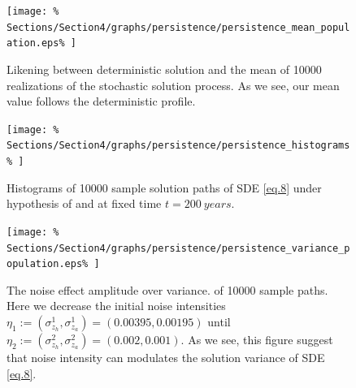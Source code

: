 \begin{figure}[p]
	\centering
	\texttt{[image: \%
		Sections/Section4/graphs/persistence/persistence\_mean\_population.eps\%
	]}
	\caption{
		Likening between deterministic solution and the mean of \num{10 000} 
		realizations of the stochastic solution process. As we see, our mean value 
		follows the deterministic profile.
	}
	\label{fig:mean_persistence}
\end{figure}
%
\begin{figure}[p]
	\centering
	\texttt{[image: \%
		Sections/Section4/graphs/persistence/persistence\_histograms\%
	]}
	\caption{
		Histograms of \num{10 000} sample solution paths of SDE 
		\eqref{eq.8} under hypothesis of 
		and at fixed time $t=\num{200} ~\si{years}$.
	}
	\label{fig:persistence_histograms}
\end{figure}
%
\begin{figure}[p]
	\centering
	\texttt{[image: \%
		Sections/Section4/graphs/persistence/persistence\_variance\_population.eps\%
	]}
	\caption{
		The noise effect amplitude over variance. 
		of \num{10000} sample paths. Here we decrease the initial noise 
		intensities 
		$
			\eta_{1}:= 
			(
				\sigma_{z_h}^1,
				\sigma_{z_a}^1
			)
			=
			(
				\num{0.00395}, %
				\num{0.00195} %
			)
		$ 
		until
		$
		\eta_{2}:= 
		(
			\sigma_{z_h}^2,
			\sigma_{z_a}^2
		)
		=
		(
			\num{0.002}, 
			\num{0.001}  
		)
		$. As we see, this figure suggest that 
		noise intensity can modulates the solution 
		variance of SDE \eqref{eq.8}.
	}\label{fig:noise_variance_reduction}
\end{figure}